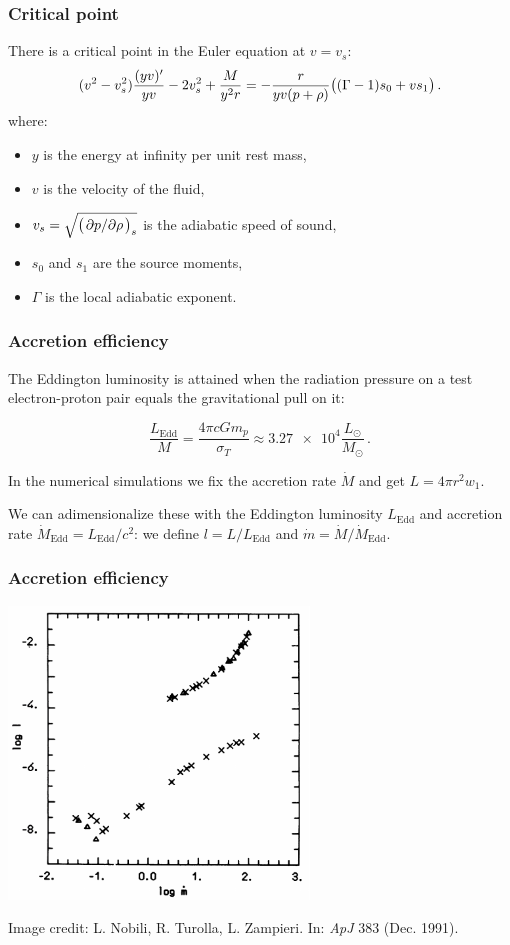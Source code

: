 \documentclass{beamer}
\begin{document}
\begin{frame}
    \frametitle{Critical point}

    There is a critical point in the Euler equation at \(v = v_s\):
        \begin{equation*}
        (v^2 - v_s^2) \frac{(yv) ^{\prime}}{yv} - 2 v_s^2 + \frac{M}{y^2 r}
        = -\frac{r}{yv (p + \rho)} \qty((\Gamma-1)s_0 + v s_1)\,.
        \end{equation*}
    where:
    \begin{itemize}
      \item \(y\) is the energy at infinity per unit rest mass,
      \item \(v\) is the velocity of the fluid,
      \item \(v_s = \sqrt{\qty(\pdv*{p}{\rho})_s}\) is the adiabatic speed of sound,
      \item \(s_0\) and \(s_1\) are the source moments,
      \item \(\Gamma\) is the local adiabatic exponent.
    \end{itemize}

\end{frame}

\begin{frame}
    \frametitle{Accretion efficiency}
    The Eddington luminosity is attained when the radiation pressure on a test electron-proton pair equals the gravitational pull on it:

    \begin{equation*}
        \frac{L_{\text{Edd}}}{M} = \frac{4 \pi c G m_p}{\sigma_T} \approx \num{3.27e4} \frac{L_{\odot}}{M_{\odot}}  \,.
    \end{equation*}

    In the numerical simulations we fix the accretion rate \(\dot{M}\) and get \(L = 4 \pi r^2 w_1\).

    We can adimensionalize these with the Eddington luminosity \(L_{\text{Edd}}\)  and accretion rate \(\dot{M}_{\text{Edd}} = L_{\text{Edd}} / c^2\):
    we define \(l = L / L_{\text{Edd}}\) and \(\dot{m} = \dot{M} /\dot{M}_{\text{Edd}}\).
\end{frame}

\begin{frame}
    \frametitle{Accretion efficiency}
    \centering
    \includegraphics[width=0.6\textwidth]{../figures/logl-logm}

    {\tiny Image credit: L. Nobili, R. Turolla, L. Zampieri. In: \emph{ApJ} 383 (Dec. 1991).}
\end{frame}
\end{document}
